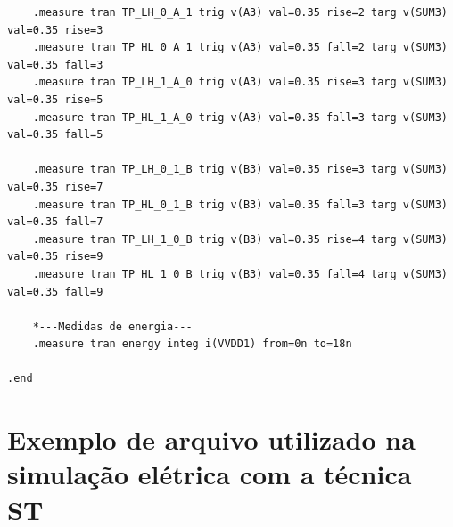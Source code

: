 \documentclass[ecp,tc, english]{iiufrgs}
\begin{document}
\begin{lstlisting}
    .measure tran TP_LH_0_A_1 trig v(A3) val=0.35 rise=2 targ v(SUM3) val=0.35 rise=3
    .measure tran TP_HL_0_A_1 trig v(A3) val=0.35 fall=2 targ v(SUM3) val=0.35 fall=3
    .measure tran TP_LH_1_A_0 trig v(A3) val=0.35 rise=3 targ v(SUM3) val=0.35 rise=5
    .measure tran TP_HL_1_A_0 trig v(A3) val=0.35 fall=3 targ v(SUM3) val=0.35 fall=5

    .measure tran TP_LH_0_1_B trig v(B3) val=0.35 rise=3 targ v(SUM3) val=0.35 rise=7
    .measure tran TP_HL_0_1_B trig v(B3) val=0.35 fall=3 targ v(SUM3) val=0.35 fall=7
    .measure tran TP_LH_1_0_B trig v(B3) val=0.35 rise=4 targ v(SUM3) val=0.35 rise=9
    .measure tran TP_HL_1_0_B trig v(B3) val=0.35 fall=4 targ v(SUM3) val=0.35 fall=9   
    
    *---Medidas de energia---
    .measure tran energy integ i(VVDD1) from=0n to=18n
    
.end
\end{lstlisting}

\chapter{Exemplo de arquivo utilizado na simulação elétrica com a técnica ST}
\end{document}
